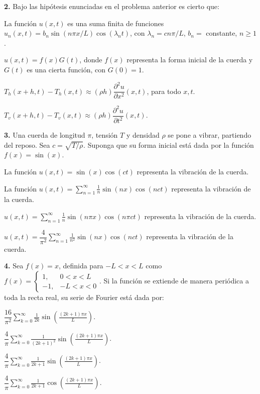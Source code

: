 \documentclass[11pt]{article}
\begin{document}
\vspace{6pt}
\textbf{2.} Bajo las hip\'otesis enunciadas en el problema anterior es cierto que:
\begin{opciones}
  \item La funci\'on $u(x,t)$ es una suma finita de funciones $u_n(x,t) = b_n \sin(n\pi x/L)\cos(\lambda_n t)$, con $\lambda_n = cn\pi/L$, $b_n = $ constante, $n\geq 1$.
  \item $u(x,t) = f(x)G(t)$, donde $f(x)$ representa la forma inicial de la cuerda y $G(t)$ es una cierta funci\'on, con $G(0)=1$.
  \item $T_h(x+h,t) - T_h(x,t) \approx (\rho h)\dfrac{\partial^2 u}{\partial x^2}(x,t)$, para todo $x,t$.
  \item $T_v(x+h,t) - T_v(x,t) \approx (\rho h)\dfrac{\partial^2 u}{\partial t^2}(x,t)$.
\end{opciones}

\vspace{6pt}
\textbf{3.} Una cuerda de longitud $\pi$, tensi\'on $T$ y densidad $\rho$ se pone a vibrar, partiendo del reposo. Sea $c = \sqrt{T/\rho}$. Suponga que su forma inicial est\'a dada por la funci\'on $f(x) = \sin(x)$.
\begin{opciones}
  \item La funci\'on $u(x,t) = \sin(x)\cos(ct)$ representa la vibraci\'on de la cuerda.
  \item La funci\'on $u(x,t) = \displaystyle\sum_{n=1}^{\infty} \frac{1}{n}\sin(nx)\cos(nct)$ representa la vibraci\'on de la cuerda.
  \item $u(x,t) = \displaystyle\sum_{n=1}^{\infty} \frac{1}{n}\sin(n\pi x)\cos(n\pi ct)$ representa la vibraci\'on de la cuerda.
  \item $u(x,t) = \dfrac{4}{\pi^2}\displaystyle\sum_{n=1}^{\infty} \frac{1}{n^2}\sin(nx)\cos(nct)$ representa la vibraci\'on de la cuerda.
\end{opciones}

\vspace{6pt}
\textbf{4.} Sea $f(x) = x$, definida para $-L<x<L$ como $f(x) = \begin{cases} 1, & 0<x<L \\ -1, & -L<x<0\end{cases}$. Si la funci\'on se extiende de manera peri\'odica a toda la recta real, su serie de Fourier est\'a dada por:
\begin{opciones}
  \item $\dfrac{16}{\pi^2}\displaystyle\sum_{k=0}^{\infty} \frac{1}{2k}\sin\left(\frac{(2k+1)\pi x}{L}\right)$.
  \item $\dfrac{4}{\pi}\displaystyle\sum_{k=0}^{\infty} \frac{1}{(2k+1)^2}\sin\left(\frac{(2k+1)\pi x}{L}\right)$.
  \item $\dfrac{4}{\pi}\displaystyle\sum_{k=0}^{\infty} \frac{1}{2k+1}\sin\left(\frac{(2k+1)\pi x}{L}\right)$.
  \item $\dfrac{4}{\pi}\displaystyle\sum_{k=0}^{\infty} \frac{1}{2k+1}\cos\left(\frac{(2k+1)\pi x}{L}\right)$.
\end{opciones}
\end{document}
